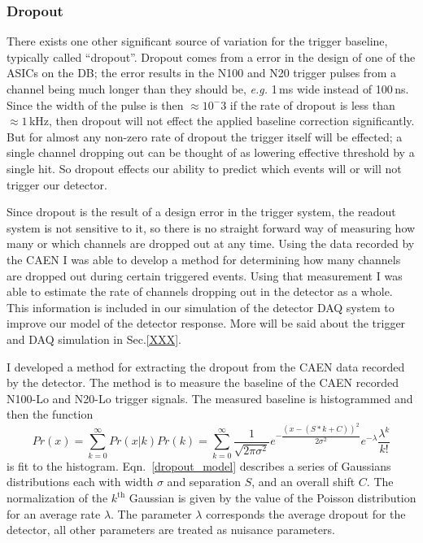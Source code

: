 \subsubsection{Dropout}
There exists one other significant source of variation for the trigger baseline, typically
called ``dropout''.
Dropout comes from a error in the design of one of the
ASICs on the DB; the error results in the N100 and N20 trigger pulses from
a channel being much longer than they should be, \textit{e.g.} 1\,ms wide
instead of 100\,ns.
Since the width of the pulse is then $\approx10^-3$ if the rate of dropout is
less than $\approx 1$\,kHz, then dropout will not effect the applied baseline
correction significantly.
But for almost any non-zero rate of dropout  the trigger itself will be effected;
a single channel dropping out can be thought of as lowering effective threshold
by a single hit.
So dropout effects our ability to predict which events will or will not
trigger our detector.

Since dropout is the result of a design error in the trigger system, the readout system
is not sensitive to it, so there is no straight forward way of measuring how many
or which channels are dropped out at any time.
Using the data recorded by the CAEN I was able to develop a method for determining
how many channels are dropped out during certain triggered events.
Using that measurement I was able to estimate the rate of channels dropping out
in the detector as a whole.
This information is included in our simulation of the detector DAQ system to improve
our model of the detector response. More will be said about the trigger and DAQ simulation
in Sec.\ref{XXX}.

I developed a method for extracting the dropout from the CAEN data
recorded by the detector.
The method is to measure the baseline of the CAEN recorded N100-Lo and N20-Lo
trigger signals.
The measured baseline is histogrammed and then the function
\begin{equation}
    Pr(x) = \sum_{k=0}^{\infty} Pr(x | k)Pr(k) = \sum_{k=0}^{\infty} \dfrac{1}{\sqrt{2 \pi \sigma^2}} e^{-\dfrac{(x - (S*k + C))^2}{2 \sigma^2}} e^{-\lambda}\dfrac{\lambda^{k}}{k!}
    \label{dropout_model}
\end{equation}
is fit to the histogram. Eqn.~\ref{dropout_model} describes a series of Gaussians
distributions each with width $\sigma$ and separation $S$, and an overall shift $C$.
The normalization of the $k^{\text{th}}$ Gaussian is given by the value of the Poisson
distribution for an average rate $\lambda$.
The parameter $\lambda$ corresponds the average dropout for the detector, all
other parameters are treated as nuisance parameters.

